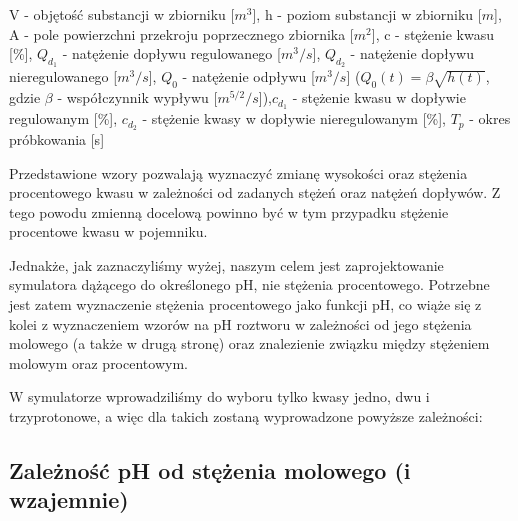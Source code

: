 \documentclass[polish,polish,a4paper,12pt]{article}
\begin{document}
	{\small V - objętość substancji w zbiorniku [$m^3$], \hspace{1em}h - poziom substancji w zbiorniku [$m$], \hspace{1em}A - pole powierzchni przekroju poprzecznego zbiornika [$m^2$], \hspace{1em}c - stężenie kwasu [\%], \hspace{1em}$Q_{d_{1}}$ - natężenie dopływu regulowanego [$m^3/s$], \hspace{1em}$Q_{d_{2}}$ - natężenie dopływu nieregulowanego [$m^3/s$], \hspace{1em} $Q_0$ - natężenie odpływu [$m^3/s$] ($Q_0(t) = \beta \sqrt{h(t)}$, gdzie $\beta$ - współczynnik wypływu [$m^{5/2}/s$]),\hspace{1em}$c_{d_{1}}$ - stężenie kwasu w dopływie regulowanym [\%], \hspace{1em}$c_{d_{2}}$ - stężenie kwasy w dopływie nieregulowanym [\%], \hspace{1em}$T_p$ - okres próbkowania [s]}
	
	Przedstawione wzory pozwalają wyznaczyć zmianę wysokości oraz stężenia procentowego kwasu w zależności od zadanych stężeń oraz natężeń dopływów. Z tego powodu zmienną docelową powinno być w tym przypadku stężenie procentowe kwasu w pojemniku.
	
	Jednakże, jak zaznaczyliśmy wyżej, naszym celem jest zaprojektowanie symulatora dążącego do określonego pH, nie stężenia procentowego. Potrzebne jest zatem wyznaczenie stężenia procentowego jako funkcji pH, co wiąże się z kolei z wyznaczeniem wzorów na pH roztworu w zależności od jego stężenia molowego (a także w drugą stronę) oraz znalezienie związku między stężeniem molowym oraz procentowym.
	
	W symulatorze wprowadziliśmy do wyboru tylko kwasy jedno, dwu i trzyprotonowe, a więc dla takich zostaną wyprowadzone powyższe zależności:
	
	\subsection{Zależność pH od stężenia molowego (i wzajemnie)}
		
\end{document}
